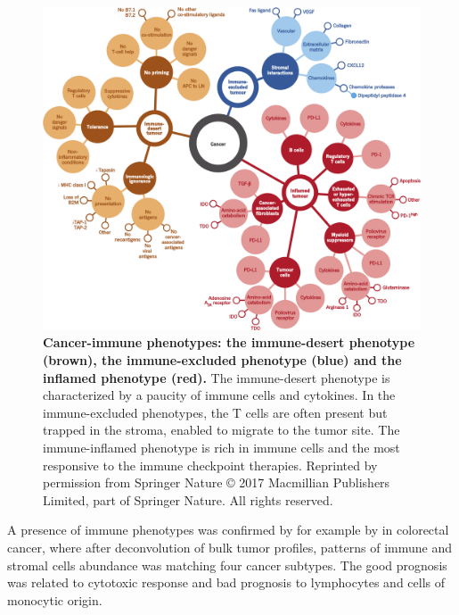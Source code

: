 \documentclass[12pt,]{book}
\theoremstyle{definition}
\theoremstyle{definition}
\theoremstyle{definition}
\theoremstyle{remark}
\begin{document}
\begin{figure}

{\centering \includegraphics[width=1\linewidth]{figures-ext/immune-phenotypes} 

}

\caption[Cancer-immune phenotypes: the immune-desert phenotype, the immune-excluded phenotype and the inflamed phenotype.]{\textbf{Cancer-immune phenotypes: the
immune-desert phenotype (brown), the immune-excluded phenotype (blue)
and the inflamed phenotype (red).} The immune-desert phenotype is
characterized by a paucity of immune cells and cytokines. In the
immune-excluded phenotypes, the T cells are often present but trapped in
the stroma, enabled to migrate to the tumor site. The immune-inflamed
phenotype is rich in immune cells and the most responsive to the immune
checkpoint therapies. Reprinted by permission from Springer Nature
\citep{Chen2017} © 2017 Macmillian Publishers Limited, part of Springer
Nature. All rights reserved.}\label{fig:immune-phenotypes}
\end{figure}












A presence of immune phenotypes was confirmed by for example by
\citet{Becht2016} in colorectal cancer, where after deconvolution of
bulk tumor profiles, patterns of immune and stromal cells abundance was
matching four cancer subtypes. The good prognosis was related to
cytotoxic response and bad prognosis to lymphocytes and cells of
monocytic origin.
\end{document}
